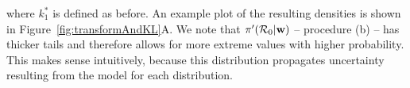 \documentclass[11pt]{article}
\begin{document}
where $k_{1}^{\ast}$ is defined as before.
An example plot of the resulting densities is shown in Figure~\ref{fig:transformAndKL}A.
We note that $\pi^{\prime}({\cal R}_0|  \mathbf{w})$ -- procedure (b) -- has thicker tails and therefore allows for more extreme values with higher probability.
This makes sense intuitively, because this distribution propagates uncertainty resulting from the model for each distribution.
\begin{figure}
\begin{center}
\end{center}
\begin{center}

\end{center}
\end{figure}
\end{document}
